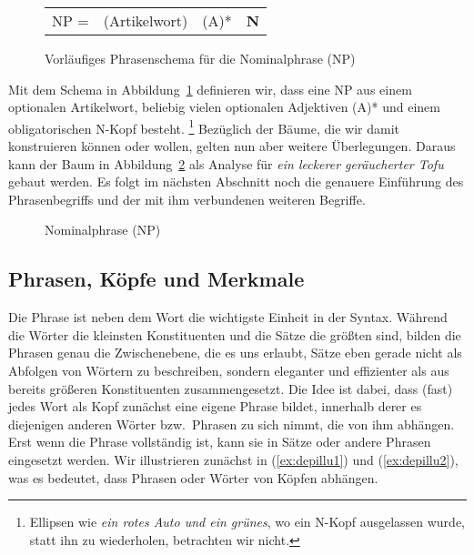 \begin{figure}
  \centering
  \begin{tabular}{c|c|c|c|}
    \cline{2-4}
    NP = & (Artikelwort) & (A)* & \textbf{N} \\
    \cline{2-4}
  \end{tabular}
  \caption{Vorläufiges Phrasenschema für die Nominalphrase (NP)}
  \label{fig:strschembsp}
\end{figure}

Mit dem Schema in Abbildung~\ref{fig:strschembsp} definieren wir, dass eine NP aus einem optionalen Artikelwort, beliebig vielen optionalen Adjektiven (A)* und einem obligatorischen N-Kopf besteht.%
\footnote{Ellipsen wie \zB \textit{ein rotes Auto und ein grünes}, wo ein N-Kopf ausgelassen wurde, statt ihn zu wiederholen, betrachten wir nicht.}
Bezüglich der Bäume, die wir damit konstruieren können oder wollen, gelten nun aber weitere Überlegungen.
Daraus kann der Baum in Abbildung~\ref{fig:vnflach} als Analyse für \textit{ein leckerer geräucherter Tofu} gebaut werden.
Es folgt im nächsten Abschnitt noch die genauere Einführung des Phrasenbegriffs und der mit ihm verbundenen weiteren Begriffe.

\begin{figure}
  \centering
  \caption{Nominalphrase (NP)}
  \label{fig:vnflach}
\end{figure}

\subsection{Phrasen, Köpfe und Merkmale}

\label{sec:koepfevalenzmaximalitaet}

Die Phrase ist neben dem Wort die wichtigste Einheit in der Syntax.
Während die Wörter die kleinsten Konstituenten und die Sätze die größten sind, bilden die Phrasen genau die Zwischenebene, die es uns erlaubt, Sätze eben gerade nicht als Abfolgen von Wörtern zu beschreiben,
sondern eleganter und effizienter als aus bereits größeren Konstituenten zusammengesetzt.
Die Idee ist dabei, dass (fast) jedes Wort als Kopf zunächst eine eigene Phrase bildet, innerhalb derer es diejenigen anderen Wörter bzw.\ Phrasen zu sich nimmt, die von ihm abhängen.
Erst wenn die Phrase vollständig ist, kann sie in Sätze oder andere Phrasen eingesetzt werden.
Wir illustrieren zunächst in (\ref{ex:depillu1}) und (\ref{ex:depillu2}), was es bedeutet, dass Phrasen oder Wörter von Köpfen abhängen.

